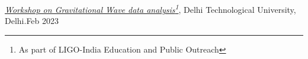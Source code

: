 \begin{itemize}[noitemsep]
{
\item \href{https://github.com/singhmukesh1729/EPO_DTU2023}{\textit{Workshop on Gravitational Wave data analysis\footnote{As part of LIGO-India Education and Public Outreach}}}, Delhi Technological University, Delhi.\hfill{Feb 2023}
}\end{itemize}
